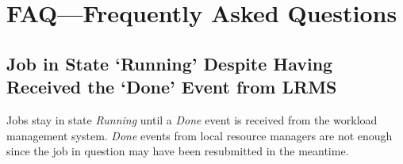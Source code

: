 %
%

\section{FAQ---Frequently Asked Questions}
\label{s:faq}

\subsection{Job in State `Running' Despite Having Received the `Done' Event from LRMS}

Jobs stay in state \emph{Running} until a \emph{Done} event is received from the workload management system. \emph{Done} events from local resource managers are not enough since the job in question may have been resubmitted in the meantime.


